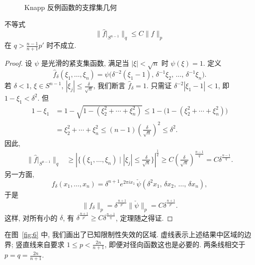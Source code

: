 \begin{figure}[htbp]
\centering
{}
\caption{Knapp 反例函数的支撑集几何}
\label{fig:5}
\end{figure}

\addtocounter{mtthm}{1}

\begin{proposition}\label{prop:6.3}
不等式
\[
\|\hat{f}|_{S^{n-1}}\|_{q}\leq C\|f\|_{p}
\]
在 $q>\frac{n-1}{n+1}p'$ 时不成立.
\end{proposition}

\begin{proof}
设 $\psi$ 是光滑的紧支集函数, 满足当 $|\xi|<\sqrt{n}$ 时 $\psi(\xi)=1$. 定义
\[
\hat{f}_{\delta}(\xi_{1},\ldots,\xi_{n})=\psi\bigl(\delta^{-2}(\xi_{1}-1),\,\delta^{-1}\xi_{2},\,\ldots,\,\delta^{-1}\xi_{n}\bigr).
\]
若 $\delta<1$, $\xi\in S^{n-1}$, $|\xi_j|\leq\frac{\delta}{\sqrt{n}}$, 我们断言 $\hat{f}_\delta=1$. 只需证 $\delta^{-2}|\xi_1-1|<1$, 即 $1-\xi_1<\delta^2$. 但
\begin{align*}
1-\xi_{1}&=1-\sqrt{1-(\xi_{2}^{2}+\cdots+\xi_{n}^{2})}
\leq 1-\bigl(1-(\xi_{2}^{2}+\cdots+\xi_{n}^{2})\bigr) \\
&=\xi_{2}^{2}+\cdots+\xi_{n}^{2}\leq(n-1)\left(\frac{\delta}{\sqrt{n}}\right)^{2}\leq\delta^{2}.
\end{align*}
因此,
\begin{align*}
\|\hat{f}|_{S^{n-1}}\|_{q}
&\geq\left|\{(\xi_{1},\ldots,\xi_{n}) \mid |\xi_{j}|\leq\frac{\delta}{\sqrt{n}}\}\right|^{\frac{1}{q}}
\geq C\left(\frac{\delta}{\sqrt{n}}\right)^{\frac{n-1}{q}}
=C\delta^{\frac{n-1}{q}}.
\end{align*}
另一方面,
\[
f_{\delta}(x_{1},\ldots,x_{n})=\delta^{n+1}e^{2\pi ix_{1}}\,\check{\psi}(\delta^{2}x_{1},\,\delta x_{2},\,\ldots,\,\delta x_{n}),
\]
于是
\[
\|f_{\delta}\|_{p}=\delta^{\frac{n+1}{p'}}\|\check{\psi}\|_{p}=C\delta^{\frac{n+1}{p'}}.
\]
这样, 对所有小的 $\delta$, 有 $\delta^{\frac{n+1}{p'}}\geq C\delta^{\frac{n-1}{q}}$, 定理随之得证.
\end{proof}

\begin{remark}\label{rem:6.4}
在图~\ref{fig:6} 中, 我们画出了已知限制性失效的区域. 虚线表示上述结果中区域的边界; 竖直线来自要求 $1\leq p<\frac{2n}{n+1}$, 即便对径向函数这也是必要的. 两条线相交于 $p=q=\frac{2n}{n+1}$.
\end{remark}

